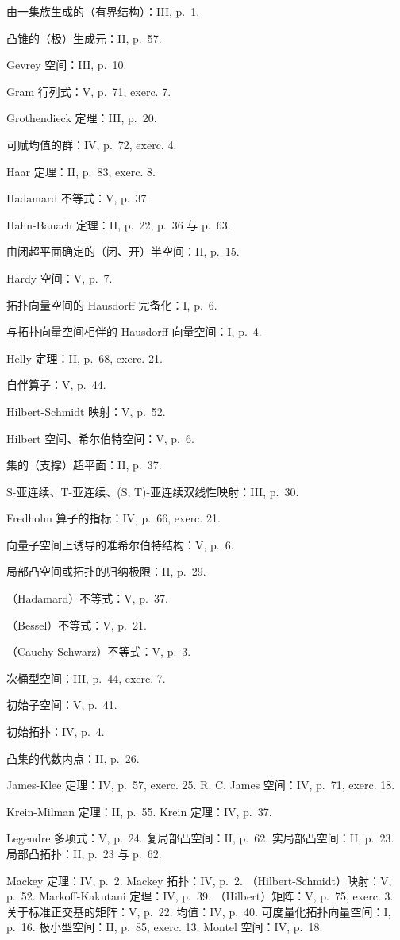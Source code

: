 由一集族生成的（有界结构）：III, p.~1.

凸锥的（极）生成元：II, p.~57.

Gevrey 空间：III, p.~10.

Gram 行列式：V, p.~71, exerc. 7.

Grothendieck 定理：III, p.~20.

可赋均值的群：IV, p.~72, exerc. 4.

Haar 定理：II, p.~83, exerc. 8.

Hadamard 不等式：V, p.~37.

Hahn-Banach 定理：II, p.~22, p.~36 与 p.~63.

由闭超平面确定的（闭、开）半空间：II, p.~15.

Hardy 空间：V, p.~7.

拓扑向量空间的 Hausdorff 完备化：I, p.~6.

与拓扑向量空间相伴的 Hausdorff 向量空间：I, p.~4.

Helly 定理：II, p.~68, exerc. 21.

自伴算子：V, p.~44.

Hilbert-Schmidt 映射：V, p.~52.

Hilbert 空间、希尔伯特空间：V, p.~6.

集的（支撑）超平面：II, p.~37.

S-亚连续、T-亚连续、(S, T)-亚连续双线性映射：III, p.~30.

Fredholm 算子的指标：IV, p.~66, exerc. 21.

向量子空间上诱导的准希尔伯特结构：V, p.~6.

局部凸空间或拓扑的归纳极限：II, p.~29.

（Hadamard）不等式：V, p.~37.

（Bessel）不等式：V, p.~21.

（Cauchy-Schwarz）不等式：V, p.~3.

次桶型空间：III, p.~44, exerc. 7.

初始子空间：V, p.~41.

初始拓扑：IV, p.~4.

凸集的代数内点：II, p.~26.

James-Klee 定理：IV, p.~57, exerc. 25. R. C. James 空间：IV, p.~71, exerc. 18.

Krein-Milman 定理：II, p.~55. Krein 定理：IV, p.~37.

Legendre 多项式：V, p.~24. 复局部凸空间：II, p.~62. 实局部凸空间：II, p.~23. 局部凸拓扑：II, p.~23 与 p.~62.

Mackey 定理：IV, p.~2. Mackey 拓扑：IV, p.~2. （Hilbert-Schmidt）映射：V, p.~52. Markoff-Kakutani 定理：IV, p.~39. （Hilbert）矩阵：V, p.~75, exerc. 3. 关于标准正交基的矩阵：V, p.~22. 均值：IV, p.~40. 可度量化拓扑向量空间：I, p.~16. 极小型空间：II, p.~85, exerc. 13. Montel 空间：IV, p.~18.

